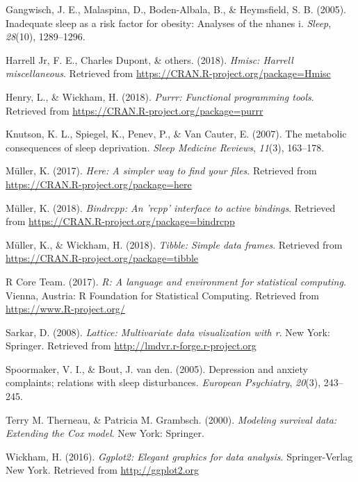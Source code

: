 \documentclass[man, noextraspace]{apa6}
\theoremstyle{definition}
\theoremstyle{definition}
\theoremstyle{definition}
\theoremstyle{remark}
\begin{document}
\hypertarget{ref-gangwisch2005inadequate}{}
Gangwisch, J. E., Malaspina, D., Boden-Albala, B., \& Heymsfield, S. B.
(2005). Inadequate sleep as a risk factor for obesity: Analyses of the
nhanes i. \emph{Sleep}, \emph{28}(10), 1289--1296.

\hypertarget{ref-R-Hmisc}{}
Harrell Jr, F. E., Charles Dupont, \& others. (2018). \emph{Hmisc:
Harrell miscellaneous}. Retrieved from
\url{https://CRAN.R-project.org/package=Hmisc}

\hypertarget{ref-R-purrr}{}
Henry, L., \& Wickham, H. (2018). \emph{Purrr: Functional programming
tools}. Retrieved from \url{https://CRAN.R-project.org/package=purrr}

\hypertarget{ref-knutson2007metabolic}{}
Knutson, K. L., Spiegel, K., Penev, P., \& Van Cauter, E. (2007). The
metabolic consequences of sleep deprivation. \emph{Sleep Medicine
Reviews}, \emph{11}(3), 163--178.

\hypertarget{ref-R-here}{}
Müller, K. (2017). \emph{Here: A simpler way to find your files}.
Retrieved from \url{https://CRAN.R-project.org/package=here}

\hypertarget{ref-R-bindrcpp}{}
Müller, K. (2018). \emph{Bindrcpp: An 'rcpp' interface to active
bindings}. Retrieved from
\url{https://CRAN.R-project.org/package=bindrcpp}

\hypertarget{ref-R-tibble}{}
Müller, K., \& Wickham, H. (2018). \emph{Tibble: Simple data frames}.
Retrieved from \url{https://CRAN.R-project.org/package=tibble}

\hypertarget{ref-R-base}{}
R Core Team. (2017). \emph{R: A language and environment for statistical
computing}. Vienna, Austria: R Foundation for Statistical Computing.
Retrieved from \url{https://www.R-project.org/}

\hypertarget{ref-R-lattice}{}
Sarkar, D. (2008). \emph{Lattice: Multivariate data visualization with
r}. New York: Springer. Retrieved from
\url{http://lmdvr.r-forge.r-project.org}

\hypertarget{ref-spoormaker2005depression}{}
Spoormaker, V. I., \& Bout, J. van den. (2005). Depression and anxiety
complaints; relations with sleep disturbances. \emph{European
Psychiatry}, \emph{20}(3), 243--245.

\hypertarget{ref-R-survival-book}{}
Terry M. Therneau, \& Patricia M. Grambsch. (2000). \emph{Modeling
survival data: Extending the Cox model}. New York: Springer.

\hypertarget{ref-R-ggplot2}{}
Wickham, H. (2016). \emph{Ggplot2: Elegant graphics for data analysis}.
Springer-Verlag New York. Retrieved from \url{http://ggplot2.org}
\end{document}

